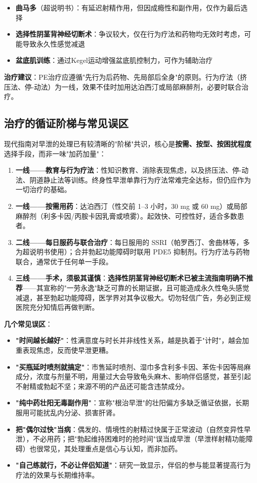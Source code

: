 \begin{itemize}[leftmargin=2cm]
	\item \textbf{曲马多}（超说明书）：有延迟射精作用，但因成瘾性和副作用，仅作为最后选择
	\item \textbf{选择性阴茎背神经切断术}：争议较大，仅在行为疗法和药物均无效时考虑，可能导致永久性感觉减退
	\item \textbf{盆底肌训练}：通过Kegel运动增强盆底肌控制力，可作为辅助治疗
\end{itemize}

\textbf{治疗建议}：PE治疗应遵循"先行为后药物、先局部后全身"的原则。行为疗法（挤压法、停-动法）为一线，效果不佳时加用达泊西汀或局部麻醉剂，必要时联合治疗。

\subsection{治疗的循证阶梯与常见误区}

现代指南对早泄的处理已有较清晰的"阶梯"共识，核心是\textbf{按需、按型、按困扰程度}选择手段，而非一味"加药加量"：

\begin{enumerate}
	\item \textbf{一线——教育与行为疗法}：性知识教育、消除表现焦虑，以及挤压法、停-动法、阴道静止法等训练。终身性早泄单靠行为疗法常难完全达标，但仍应作为一切治疗的基础。
	\item \textbf{一线——按需用药}：达泊西汀（性交前 1--3 小时，30 mg 或 60 mg）或局部麻醉剂（利多卡因/丙胺卡因乳膏或喷雾）。起效快、可控性好，适合多数患者。
	\item \textbf{二线——每日服药与联合治疗}：每日服用的 SSRI（帕罗西汀、舍曲林等，多为超说明书使用）；合并勃起功能障碍时联用 PDE5 抑制剂。行为疗法与药物联合，通常优于任何单一手段。
	\item \textbf{三线——手术，须极其谨慎}：\textbf{选择性阴茎背神经切断术已被主流指南明确不推荐}——其宣称的"一劳永逸"缺乏可靠的长期证据，且可能造成永久性龟头感觉减退，甚至勃起功能障碍，医学界对其争议极大。切勿轻信广告，务必到正规医院充分知情后再做判断。
\end{enumerate}

\noindent\textbf{几个常见误区}：

\begin{itemize}
	\item \textbf{"时间越长越好"}：性满意度与时长并非线性关系，越是执着于"计时"，越会加重表现焦虑，反而使早泄更糟。
	\item \textbf{"买瓶延时喷剂就搞定"}：市售延时喷剂、湿巾多含利多卡因、苯佐卡因等局麻成分，浓度与剂量不明，用量过大会导致龟头麻木、影响伴侣感觉，甚至引起不射精或勃起不坚；来源不明的产品还可能含违禁成分。
	\item \textbf{"纯中药壮阳无毒副作用"}：宣称"根治早泄"的壮阳偏方多缺乏循证依据，长期服用可能扰乱内分泌、损害肝肾。
	\item \textbf{把"偶尔过快"当病}：偶发的、情境性的射精过快属于正常波动（自然变异性早泄），不必用药；把"勃起维持困难时的抢时间"误当成早泄（早泄样射精功能障碍）也很常见，其处理重点是信心与认知，而非加药。
	\item \textbf{"自己练就行，不必让伴侣知道"}：研究一致显示，伴侣的参与能显著提高行为疗法的效果与长期维持率。
\end{itemize}

